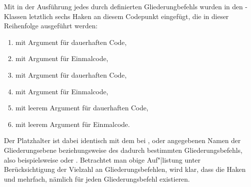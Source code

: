 \begin{Example}
  Mit %
   in der Ausführung jedes
  durch  definierten
  Gliederungbefehls wurden in den \KOMAScript-Klassen letztlich sechs Haken an
  diesem Codepunkt eingefügt, die in dieser Reihenfolge ausgeführt werden:
  \begin{enumerate}
  \item {} mit Argument  für
    dauerhaften Code,
  \item {} mit Argument  für
    Einmalcode,
  \item {} mit Argument  für
    dauerhaften Code,
  \item {} mit Argument  für
    Einmalcode,
  \item {} mit leerem Argument für
    dauerhaften Code,
  \item {} mit leerem Argument für
    Einmalcode.
  \end{enumerate}
  Der Platzhalter  ist dabei identisch mit dem bei
  ,
   oder
  angegebenen Namen
  der Gliederungsebene beziehungsweise des dadurch bestimmten
  Gliederungsbefehls, also beispielsweise  oder
  . Betrachtet man obige Auf"|listung unter
  Berücksichtigung der Vielzahl an Gliederungsbefehlen,
  wird klar, dass die Haken  und 
  mehrfach, nämlich für jeden Gliederungsbefehl existieren.%
\end{Example}%
%
\EndIndexGroup
\ExampleEndFix


